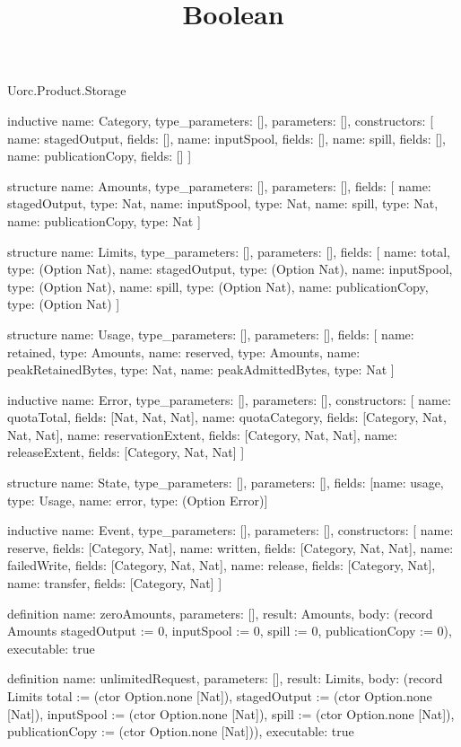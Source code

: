 \begin{lexlean}{Uorc.Product.Storage}
\title{Boolean}
\begin{semanticmodule}
inductive{
  name: Category,
  type_parameters: [],
  parameters: [],
  constructors: [
    {name: stagedOutput, fields: []},
    {name: inputSpool, fields: []},
    {name: spill, fields: []},
    {name: publicationCopy, fields: []}
  ]
}

structure{
  name: Amounts,
  type_parameters: [],
  parameters: [],
  fields: [
    {name: stagedOutput, type: Nat},
    {name: inputSpool, type: Nat},
    {name: spill, type: Nat},
    {name: publicationCopy, type: Nat}
  ]
}

structure{
  name: Limits,
  type_parameters: [],
  parameters: [],
  fields: [
    {name: total, type: (Option Nat)},
    {name: stagedOutput, type: (Option Nat)},
    {name: inputSpool, type: (Option Nat)},
    {name: spill, type: (Option Nat)},
    {name: publicationCopy, type: (Option Nat)}
  ]
}

structure{
  name: Usage,
  type_parameters: [],
  parameters: [],
  fields: [
    {name: retained, type: Amounts},
    {name: reserved, type: Amounts},
    {name: peakRetainedBytes, type: Nat},
    {name: peakAdmittedBytes, type: Nat}
  ]
}

inductive{
  name: Error,
  type_parameters: [],
  parameters: [],
  constructors: [
    {name: quotaTotal, fields: [Nat, Nat, Nat]},
    {name: quotaCategory, fields: [Category, Nat, Nat, Nat]},
    {name: reservationExtent, fields: [Category, Nat, Nat]},
    {name: releaseExtent, fields: [Category, Nat, Nat]}
  ]
}

structure{
  name: State,
  type_parameters: [],
  parameters: [],
  fields: [{name: usage, type: Usage}, {name: error, type: (Option Error)}]
}

inductive{
  name: Event,
  type_parameters: [],
  parameters: [],
  constructors: [
    {name: reserve, fields: [Category, Nat]},
    {name: written, fields: [Category, Nat, Nat]},
    {name: failedWrite, fields: [Category, Nat, Nat]},
    {name: release, fields: [Category, Nat]},
    {name: transfer, fields: [Category, Nat]}
  ]
}

definition{
  name: zeroAmounts,
  parameters: [],
  result: Amounts,
  body: (record Amounts {stagedOutput := 0, inputSpool := 0, spill := 0, publicationCopy := 0}),
  executable: true
}

definition{
  name: unlimitedRequest,
  parameters: [],
  result: Limits,
  body: (record Limits {total := (ctor Option.none [Nat]), stagedOutput := (ctor Option.none [Nat]), inputSpool := (ctor Option.none [Nat]), spill := (ctor Option.none [Nat]), publicationCopy := (ctor Option.none [Nat])}),
  executable: true
}


\end{semanticmodule}
\end{lexlean}
